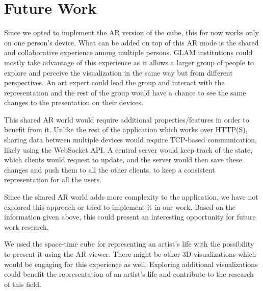 \section{Future Work}\label{sec:future-work}
Since we opted to implement the AR version of the cube, this for now works only on one person's device. What can be added on top of this AR mode is
the shared and collaborative experience among multiple persons. GLAM institutions could mostly take advantage of this experience as it allows a
larger group of people to explore and perceive the visualization in the same way but from different perspectives. An art expert could lead the group
and interact with the representation and the rest of the group would have a chance to see the same changes to the presentation on their devices.

This shared AR world would require additional properties/features in order to benefit from it. Unlike the rest of the application
which works over HTTP(S), sharing data between multiple devices would require TCP-based communication, likely using the WebSocket API. A central
server would keep track of the state, which clients would request to update, and the server would then save these changes and push them to all the
other clients, to keep a consistent representation for all the users.

Since the shared AR world adds more complexity to the application, we have not explored this approach or tried to implement it in our work.
Based on the information given above, this could present an interesting opportunity for future work research.

We used the space-time cube for representing an artist's life with the possibility to present it using the AR viewer. There might be other 3D
visualizations which would be engaging for this experience as well. Exploring additional visualizations could benefit the representation of an
artist's life and contribute to the research of this field.
